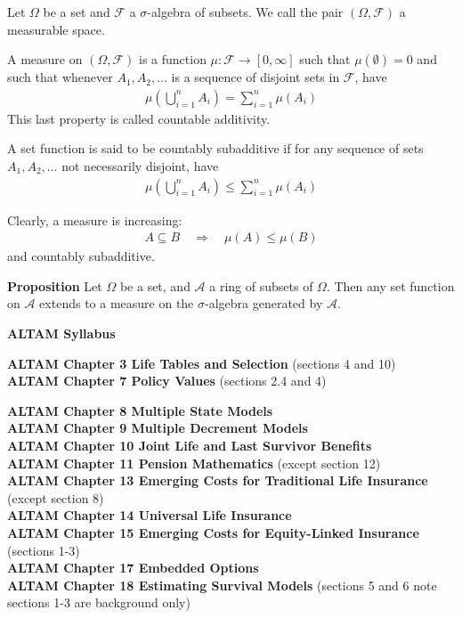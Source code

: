 \documentclass[hidelinks, 12pt]{article}
\theoremstyle{mydefstyle}
\theoremstyle{mythmstyle}
\newcounter{prop}
\begin{document}
Let $\Omega$ be a set and $\mathcal{F}$ a $\sigma$-algebra of subsets. We call the pair $(\Omega, \mathcal{F})$ a measurable space.

A measure on $(\Omega, \mathcal{F})$ is a function $\mu : \mathcal{F} \to [0, \infty]$ such that $\mu(\emptyset) = 0$ and such that whenever $A_1, A_2, \dots$ is a sequence of disjoint sets in $\mathcal{F}$, have
\begin{gather*}
\mu\left(\bigcup_{i=1}^n A_i\right) = \sum_{i=1}^n \mu(A_i)
\end{gather*}
This last property is called countable additivity.

A set function is said to be countably subadditive if for any sequence of sets $A_1, A_2, \dots$ not necessarily disjoint, have
\begin{gather*}
\mu\left(\bigcup_{i=1}^n A_i\right) \le\sum_{i=1}^n \mu(A_i)
\end{gather*}

Clearly, a measure is increasing:
\begin{gather*}
A \subseteq B \quad\Rightarrow\quad \mu(A) \le \mu(B)
\end{gather*}
and countably subadditive. 

\textbf{Proposition} Let $\Omega$ be a set, and $\mathcal{A}$ a ring of subsets of $\Omega$. Then any set function on $\mathcal{A}$ extends to a measure on the $\sigma$-algebra generated by $\mathcal{A}$.

\textbf{ALTAM Syllabus}

\textbf{ALTAM Chapter 3 Life Tables and Selection} (sections 4 and 10) \\
\textbf{ALTAM Chapter 7 Policy Values} (sections 2.4 and 4)

\textbf{ALTAM Chapter 8 Multiple State Models} \\
\textbf{ALTAM Chapter 9 Multiple Decrement Models} \\
\textbf{ALTAM Chapter 10 Joint Life and Last Survivor Benefits} \\
\textbf{ALTAM Chapter 11 Pension Mathematics} (except section 12) \\
\textbf{ALTAM Chapter 13 Emerging Costs for Traditional Life Insurance} (except section 8) \\
\textbf{ALTAM Chapter 14 Universal Life Insurance} \\
\textbf{ALTAM Chapter 15 Emerging Costs for Equity-Linked Insurance} (sections 1-3) \\
\textbf{ALTAM Chapter 17 Embedded Options} \\
\textbf{ALTAM Chapter 18 Estimating Survival Models} (sections 5 and 6 note sections 1-3 are background only)
\end{document}

